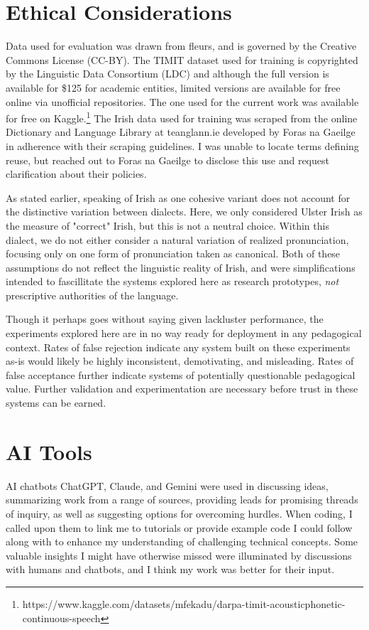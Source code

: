 \documentclass[thesis]{cluu}
\begin{document}
\chapter{Ethical Considerations}
Data used for evaluation was drawn from \gls{fleurs}, and is governed by the Creative Commons License (CC-BY). The TIMIT dataset used for training is copyrighted by the Linguistic Data Consortium (LDC) and although the full version is available for \$125 for academic entities, limited versions are available for free online via unofficial repositories. The one used for the current work was available for free on Kaggle.\footnote{https://www.kaggle.com/datasets/mfekadu/darpa-timit-acousticphonetic-continuous-speech} The Irish data used for training was scraped from the online Dictionary and Language Library at teanglann.ie developed by Foras na Gaeilge in adherence with their scraping guidelines. I was unable to locate terms defining reuse, but reached out to Foras na Gaeilge to disclose this use and request clarification about their policies.

As stated earlier, speaking of Irish as one cohesive variant does not account for the distinctive variation between dialects. Here, we only considered Ulster Irish as the measure of "correct" Irish, but this is not a neutral choice. Within this dialect, we do not either consider a natural variation of realized pronunciation, focusing only on one form of pronunciation taken as canonical. Both of these assumptions do not reflect the linguistic reality of Irish, and were simplifications intended to fascillitate the systems explored here as research prototypes, \textit{not} prescriptive authorities of the language.

Though it perhaps goes without saying given lackluster performance, the experiments explored here are in no way ready for deployment in any pedagogical context. Rates of false rejection indicate any system built on these experiments as-is would likely be highly inconsistent, demotivating, and misleading. Rates of false acceptance further indicate systems of potentially questionable pedagogical value. Further validation and experimentation are necessary before trust in these systems can be earned.

\chapter{AI Tools}
AI chatbots ChatGPT, Claude, and Gemini were used in discussing ideas, summarizing work from a range of sources, providing leads for promising threads of inquiry, as well as suggesting options for overcoming hurdles. When coding, I called upon them to link me to tutorials or provide example code I could follow along with to enhance my understanding of challenging technical concepts. Some valuable insights I might have otherwise missed were illuminated by discussions with humans and chatbots, and I think my work was better for their input. 
\end{document}
